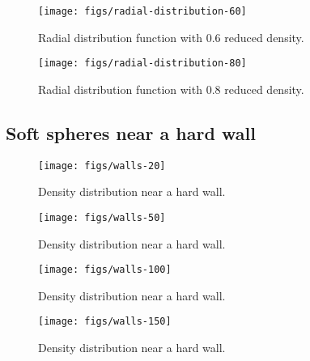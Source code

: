 \documentclass[letterpaper,twocolumn,amsmath,amssymb,prb]{revtex4-1}
\begin{document}
\begin{figure}
\begin{center}
\texttt{[image: figs/radial-distribution-60]}
\end{center}
\caption{Radial distribution function with 0.6 reduced density.}
\label{fig:radial-distribution-60}
\end{figure}

\begin{figure}
\begin{center}
\texttt{[image: figs/radial-distribution-80]}
\end{center}
\caption{Radial distribution function with 0.8 reduced density.}
\label{fig:radial-distribution-60}
\end{figure}

\subsection{Soft spheres near a hard wall}

\begin{figure}
\begin{center}
\texttt{[image: figs/walls-20]}
\end{center}
\caption{Density distribution near a hard wall.}
\label{fig:walls-20}
\end{figure}

\begin{figure}
\begin{center}
\texttt{[image: figs/walls-50]}
\end{center}
\caption{Density distribution near a hard wall.}
\label{fig:walls-50}
\end{figure}

\begin{figure}
\begin{center}
\texttt{[image: figs/walls-100]}
\end{center}
\caption{Density distribution near a hard wall.}
\label{fig:walls-100}
\end{figure}

\begin{figure}
\begin{center}
\texttt{[image: figs/walls-150]}
\end{center}
\caption{Density distribution near a hard wall.}
\label{fig:walls-150}
\end{figure}

\end{document}
